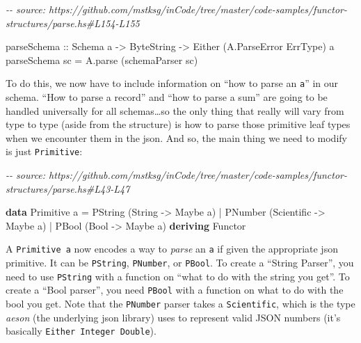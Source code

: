 \documentclass[]{article}
\newenvironment{Shaded}{}{}
\newcommand{\CommentTok}[1]{\textcolor[rgb]{0.38,0.63,0.69}{\textit{#1}}}
\newcommand{\DataTypeTok}[1]{\textcolor[rgb]{0.56,0.13,0.00}{#1}}
\newcommand{\KeywordTok}[1]{\textcolor[rgb]{0.00,0.44,0.13}{\textbf{#1}}}
\newcommand{\NormalTok}[1]{#1}
\newcommand{\OperatorTok}[1]{\textcolor[rgb]{0.40,0.40,0.40}{#1}}
\newcommand{\OtherTok}[1]{\textcolor[rgb]{0.00,0.44,0.13}{#1}}
\begin{document}
\begin{Shaded}
\begin{Highlighting}[]
\CommentTok{{-}{-} source: https://github.com/mstksg/inCode/tree/master/code{-}samples/functor{-}structures/parse.hs\#L154{-}L155}

\OtherTok{parseSchema ::} \DataTypeTok{Schema}\NormalTok{ a }\OtherTok{{-}\textgreater{}} \DataTypeTok{ByteString} \OtherTok{{-}\textgreater{}} \DataTypeTok{Either}\NormalTok{ (}\DataTypeTok{A.ParseError} \DataTypeTok{ErrType}\NormalTok{) a}
\NormalTok{parseSchema sc }\OtherTok{=}\NormalTok{ A.parse (schemaParser sc)}
\end{Highlighting}
\end{Shaded}

To do this, we now have to include information on ``how to parse an \texttt{a}''
in our schema. ``How to parse a record'' and ``how to parse a sum'' are going to
be handled universally for all schemas\ldots so the only thing that really will
vary from type to type (aside from the structure) is how to parse those
primitive leaf types when we encounter them in the json. And so, the main thing
we need to modify is just \texttt{Primitive}:

\begin{Shaded}
\begin{Highlighting}[]
\CommentTok{{-}{-} source: https://github.com/mstksg/inCode/tree/master/code{-}samples/functor{-}structures/parse.hs\#L43{-}L47}

\KeywordTok{data} \DataTypeTok{Primitive}\NormalTok{ a }\OtherTok{=}
      \DataTypeTok{PString}\NormalTok{ (}\DataTypeTok{String}     \OtherTok{{-}\textgreater{}} \DataTypeTok{Maybe}\NormalTok{ a)}
    \OperatorTok{|} \DataTypeTok{PNumber}\NormalTok{ (}\DataTypeTok{Scientific} \OtherTok{{-}\textgreater{}} \DataTypeTok{Maybe}\NormalTok{ a)}
    \OperatorTok{|} \DataTypeTok{PBool}\NormalTok{   (}\DataTypeTok{Bool}       \OtherTok{{-}\textgreater{}} \DataTypeTok{Maybe}\NormalTok{ a)}
  \KeywordTok{deriving} \DataTypeTok{Functor}
\end{Highlighting}
\end{Shaded}

A \texttt{Primitive\ a} now encodes a way to \emph{parse} an \texttt{a} if given
the appropriate json primitive. It can be \texttt{PString}, \texttt{PNumber}, or
\texttt{PBool}. To create a ``String Parser'', you need to use \texttt{PString}
with a function on ``what to do with the string you get''. To create a ``Bool
parser'', you need \texttt{PBool} with a function on what to do with the bool
you get. Note that the \texttt{PNumber} parser takes a \texttt{Scientific},
which is the type \emph{aeson} (the underlying json library) uses to represent
valid JSON numbers (it's basically \texttt{Either\ Integer\ Double}).
\end{document}
